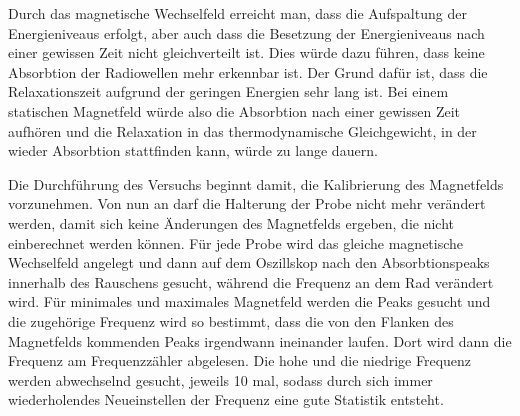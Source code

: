 Durch das magnetische Wechselfeld erreicht man, dass die Aufspaltung der Energieniveaus erfolgt, aber auch dass die Besetzung der Energieniveaus nach einer gewissen Zeit nicht gleichverteilt ist. Dies würde dazu führen, dass keine Absorbtion der Radiowellen mehr erkennbar ist. Der Grund dafür ist, dass die Relaxationszeit aufgrund der geringen Energien sehr lang ist. Bei einem statischen Magnetfeld würde also die Absorbtion nach einer gewissen Zeit aufhören und die Relaxation in das thermodynamische Gleichgewicht, in der wieder Absorbtion stattfinden kann, würde zu lange dauern.

Die Durchführung des Versuchs beginnt damit, die Kalibrierung des Magnetfelds vorzunehmen. Von nun an darf die Halterung der Probe nicht mehr verändert werden, damit sich keine Änderungen des Magnetfelds ergeben, die nicht einberechnet werden können. Für jede Probe wird das gleiche magnetische Wechselfeld angelegt und dann auf dem Oszillskop nach den Absorbtionspeaks innerhalb des Rauschens gesucht, während die Frequenz an dem Rad verändert wird. Für minimales und maximales Magnetfeld werden die Peaks gesucht und die zugehörige Frequenz wird so bestimmt, dass die von den Flanken des Magnetfelds kommenden Peaks irgendwann ineinander laufen. Dort wird dann die Frequenz am Frequenzzähler abgelesen. Die hohe und die niedrige Frequenz werden abwechselnd gesucht, jeweils 10 mal, sodass durch sich immer wiederholendes Neueinstellen der Frequenz eine gute Statistik entsteht.
